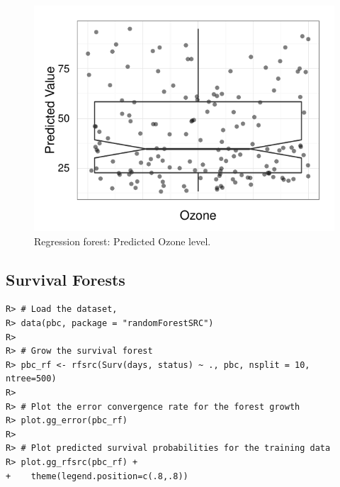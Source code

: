 \documentclass[nojss]{jss}\usepackage[]{graphicx}\usepackage[]{color}
\makeatletter
\def\maxwidth{ %
  \ifdim\Gin@nat@width>\linewidth
    \linewidth
  \else
    \Gin@nat@width
  \fi
}
\newenvironment{kframe}{%
 \def\at@end@of@kframe{}%
 \ifinner\ifhmode%
  \def\at@end@of@kframe{\end{minipage}}%
  \begin{minipage}{\columnwidth}%
 \fi\fi%
 \def\FrameCommand##1{\hskip\@totalleftmargin \hskip-\fboxsep
 \colorbox{shadecolor}{##1}\hskip-\fboxsep
     \hskip-\linewidth \hskip-\@totalleftmargin \hskip\columnwidth}%
 \MakeFramed {\advance\hsize-\width
   \@totalleftmargin\z@ \linewidth\hsize
   \@setminipage}}%
 {\par\unskip\endMakeFramed%
 \at@end@of@kframe}
\newenvironment{knitrout}{}{} %
\makeatother
\begin{document}
\begin{knitrout}\footnotesize
{}\color{fgcolor}\begin{figure}[!htpb]


{\centering \includegraphics[width=\maxwidth]{figure/vig-airq-rf-plot-1} 

}

\caption[Regression forest]{Regression forest: Predicted Ozone level.\label{fig:airq-rf-plot}}
\end{figure}


\end{knitrout}


\subsection{Survival Forests}
\begin{knitrout}\footnotesize
{}\color{fgcolor}\begin{kframe}
\begin{verbatim}
R> # Load the dataset,
R> data(pbc, package = "randomForestSRC")
R> 
R> # Grow the survival forest
R> pbc_rf <- rfsrc(Surv(days, status) ~ ., pbc, nsplit = 10, ntree=500)
R> 
R> # Plot the error convergence rate for the forest growth
R> plot.gg_error(pbc_rf)
R> 
R> # Plot predicted survival probabilities for the training data
R> plot.gg_rfsrc(pbc_rf) +
+    theme(legend.position=c(.8,.8))
\end{verbatim}
\end{kframe}
\end{knitrout}
\end{document}
